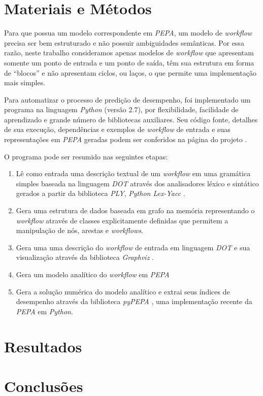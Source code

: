 \documentclass[a4paper,11pt]{article}
\begin{document}
    \section{Materiais e Métodos}
        Para que possua um modelo correspondente em \emph{PEPA}, um modelo de \emph{workflow} precisa ser bem estruturado e não possuir ambiguidades semânticas. Por essa razão, neste trabalho consideramos apenas modelos de \emph{workflow} que apresentam somente um ponto de entrada e um ponto de saída, têm sua estrutura em forma de ``blocos''  e não apresentam ciclos, ou laços, o que permite uma implementação mais simples.

        Para automatizar o processo de predição de desempenho, foi implementado um programa na linguagem \emph{Python} (versão 2.7), por flexibilidade, facilidade de aprendizado e grande número de bibliotecas auxiliares. Seu código fonte, detalhes de sua execução, dependências e exemplos de \emph{workflow} de entrada e suas representações em \emph{PEPA} geradas podem ser conferidos na página do projeto \cite{web:script}.

        \newpage
        O programa pode ser resumido nas seguintes etapas:

        \begin{enumerate}
            \item Lê como entrada uma descrição textual de um \emph{workflow} em uma gramática simples baseada na linguagem \emph{DOT} \cite{web:dot} através dos analisadores léxico e sintático gerados a partir da biblioteca \emph{PLY}, \emph{Python Lex-Yacc} \cite{web:ply}.
            \item Gera uma estrutura de dados baseada em grafo na memória representando o \emph{workflow} através de classes explicitamente definidas que permitem a manipulação de nós, arestas e \emph{workflows}.
            \item Gera uma uma descrição do \emph{workflow} de entrada em linguagem \emph{DOT} e sua visualização através da biblioteca \emph{Graphviz} \cite{web:graphviz}.
            \item Gera um modelo analítico do \emph{workflow} em \emph{PEPA}
            \item Gera a solução numérica do modelo analítico e extrai seus índices de desempenho através da biblioteca \emph{pyPEPA} \cite{web:pypepa}, uma implementação recente da \emph{PEPA} em \emph{Python}.
        \end{enumerate}

    \section{Resultados}
    \section{Conclusões}


    
    
\end{document}
